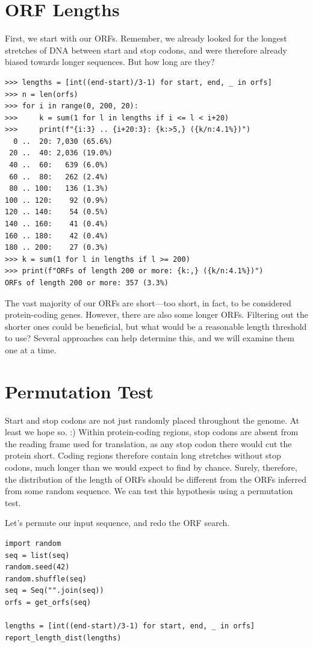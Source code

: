 \section{ORF Lengths}

First, we start with our ORFs. Remember, we already looked for the longest stretches of DNA between start and stop codons, and were therefore already biased towards longer sequences. But how long are they?

\vspace*{3mm}
\begin{lstlisting}
>>> lengths = [int((end-start)/3-1) for start, end, _ in orfs]
>>> n = len(orfs)
>>> for i in range(0, 200, 20):
>>>     k = sum(1 for l in lengths if i <= l < i+20)
>>>     print(f"{i:3} .. {i+20:3}: {k:>5,} ({k/n:4.1%})")
  0 ..  20: 7,030 (65.6%)
 20 ..  40: 2,036 (19.0%)
 40 ..  60:   639 (6.0%)
 60 ..  80:   262 (2.4%)
 80 .. 100:   136 (1.3%)
100 .. 120:    92 (0.9%)
120 .. 140:    54 (0.5%)
140 .. 160:    41 (0.4%)
160 .. 180:    42 (0.4%)
180 .. 200:    27 (0.3%)
>>> k = sum(1 for l in lengths if l >= 200)
>>> print(f"ORFs of length 200 or more: {k:,} ({k/n:4.1%})")
ORFs of length 200 or more: 357 (3.3%)
\end{lstlisting}

The vast majority of our ORFs are short---too short, in fact, to be considered protein-coding genes. However, there are also some longer ORFs. Filtering out the shorter ones could be beneficial, but what would be a reasonable length threshold to use? Several approaches can help determine this, and we will examine them one at a time.

\section{Permutation Test}

Start and stop codons are not just randomly placed throughout the genome. At least we hope so. :) Within protein-coding regions, stop codons are absent from the reading frame used for translation, as any stop codon there would cut the protein short. Coding regions therefore contain long stretches without stop codons, much longer than we would expect to find by chance. Surely, therefore, the distribution of the length of ORFs should be different from the ORFs inferred from some random sequence. We can test this hypothesis using a permutation test.

Let's permute our input sequence, and redo the ORF search.

\vspace*{3mm}
\begin{lstlisting}
import random
seq = list(seq)
random.seed(42)
random.shuffle(seq)
seq = Seq("".join(seq))
orfs = get_orfs(seq)

lengths = [int((end-start)/3-1) for start, end, _ in orfs]
report_length_dist(lengths)
\end{lstlisting}

